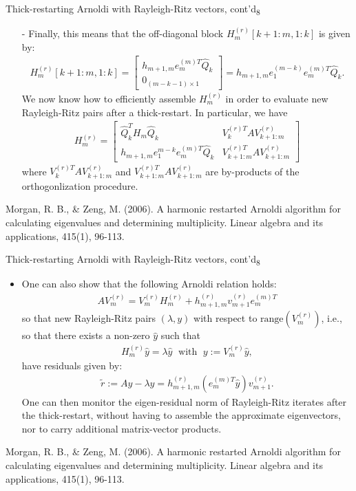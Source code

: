 \documentclass[t,usepdftitle=false]{beamer}
\begin{document}
\begin{frame}{Thick-restarting Arnoldi with Rayleigh-Ritz vectors, cont'd\textsubscript{8}}
\begin{itemize}
\item[-] Finally, this means that the off-diagonal block $H_m^{(r)}[k+1\!:\!m,1\!:\!k]$ is given by:
\begin{align*}
H_m^{(r)}[k+1\!:\!m,1\!:\!k]
=
\begin{bmatrix}
h_{m+1,m}e_m^{(m)T}\hat{Q}_k\\
0_{{(m-k-1)}\times 1}
\end{bmatrix}
=
h_{m+1,m}e_1^{(m-k)}e_m^{(m)T}\hat{Q}_k.
\end{align*}
We now know how to efficiently assemble $H_m^{(r)}$ in order to evaluate new Rayleigh-Ritz pairs after a thick-restart.
In particular, we have
\begin{align*}
H_m^{(r)}
=
\begin{bmatrix}
\hat{Q}_k^TH_m\hat{Q}_k&V_k^{(r)T}AV_{k+1:m}^{(r)}\\
h_{m+1,m}e_1^{m-k}e_m^{(m)T}\hat{Q}_k&V_{k+1:m}^{(r)T}AV_{k+1:m}^{(r)}
\end{bmatrix}
\end{align*}
where $V_k^{(r)T}AV_{k+1:m}^{(r)}$ and $V_{k+1:m}^{(r)T}AV_{k+1:m}^{(r)}$ are by-products of the orthogonlization procedure.
\end{itemize}\smallskip
\tiny{Morgan, R. B., \& Zeng, M. (2006). A harmonic restarted Arnoldi algorithm for calculating eigenvalues and determining
multiplicity. Linear algebra and its applications, 415(1), 96-113.}
\end{frame}

\begin{frame}{Thick-restarting Arnoldi with Rayleigh-Ritz vectors, cont'd\textsubscript{8}}
\begin{itemize}
\item One can also show that the following Arnoldi relation holds:
\begin{align*}
AV_m^{(r)}=V_m^{(r)}H_m^{(r)}+h^{(r)}_{m+1,m}v_{m+1}^{(r)}e_m^{(m)T}
\end{align*}
so that new Rayleigh-Ritz pairs $(\lambda,y)$ with respect to $\text{range}(V_m^{(r)})$, i.e., so that there exists a non-zero $\hat{y}$ such that 
\begin{align*}
H_m^{(r)}\hat{y}=\lambda\hat{y}
\;\text{ with }\;
y:=V_m^{(r)}\hat{y},
\end{align*}
have residuals given by:
\begin{align*}
\tilde{r}:=Ay-\lambda y=h_{m+1,m}^{(r)}(e_m^{(m)T}\hat{y})v_{m+1}^{(r)}.
\end{align*}
One can then monitor the eigen-residual norm of Rayleigh-Ritz iterates after the thick-restart, without having to assemble the approximate eigenvectors, nor to carry additional matrix-vector products.
\end{itemize}\smallskip
\tiny{Morgan, R. B., \& Zeng, M. (2006). A harmonic restarted Arnoldi algorithm for calculating eigenvalues and determining
multiplicity. Linear algebra and its applications, 415(1), 96-113.}
\end{frame}
\end{document}
